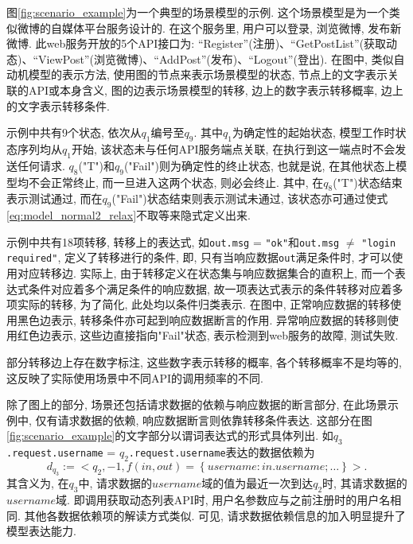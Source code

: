         图\ref{fig:scenario_example}为一个典型的场景模型的示例. 这个场景模型是为一个类似微博的自媒体平台服务设计的. 在这个服务里, 用户可以登录, 浏览微博, 发布新微博. 此web服务开放的5个API接口为: “Register”(注册)、“GetPostList”(获取动态)、“ViewPost”(浏览微博)、“AddPost”(发布)、“Logout”(登出). 在图中, 类似自动机模型的表示方法, 使用图的节点来表示场景模型的状态, 节点上的文字表示关联的API或本身含义, 图的边表示场景模型的转移, 边上的数字表示转移概率, 边上的文字表示转移条件.
        
        示例中共有9个状态, 依次从$q_1$编号至$q_9$. 其中$q_1$为确定性的起始状态, 模型工作时状态序列均从$q_1$开始, 该状态未与任何API服务端点关联, 在执行到这一端点时不会发送任何请求. $q_8$("T")和$q_9$("Fail")则为确定性的终止状态, 也就是说, 在其他状态上模型均不会正常终止, 而一旦进入这两个状态, 则必会终止. 其中, 在$q_8$("T")状态结束表示测试通过, 而在$q_9$("Fail")状态结束则表示测试未通过, 该状态亦可通过使式\ref{eq:model_normal2_relax}不取等来隐式定义出来.
        
        示例中共有18项转移, 转移上的表达式, 如\texttt{out.msg} = \texttt{"ok"}和\texttt{out.msg} $\neq$ \texttt{"login required"}, 定义了转移进行的条件, 即, 只有当响应数据\texttt{out}满足条件时, 才可以使用对应转移边. 实际上, 由于转移定义在状态集与响应数据集合的直积上, 而一个表达式条件对应着多个满足条件的响应数据, 故一项表达式表示的条件转移对应着多项实际的转移, 为了简化, 此处均以条件归类表示. 在图中, 正常响应数据的转移使用黑色边表示, 转移条件亦可起到响应数据断言的作用. 异常响应数据的转移则使用红色边表示, 这些边直接指向"Fail"状态, 表示检测到web服务的故障, 测试失败.
        
        部分转移边上存在数字标注, 这些数字表示转移的概率, 各个转移概率不是均等的, 这反映了实际使用场景中不同API的调用频率的不同.
        
        除了图上的部分, 场景还包括请求数据的依赖与响应数据的断言部分, 在此场景示例中, 仅有请求数据的依赖, 响应数据断言则依靠转移条件表达. 这部分在图\ref{fig:scenario_example}的文字部分以谓词表达式的形式具体列出. 如$q_3$\texttt{.request.username} = $q_2$\texttt{.request.username}表达的数据依赖为
        \begin{equation}
            d_{q_3} := <q_2, -1, f(in, out) = \left\{username: in.username;\dots\right\}>.
        \end{equation}
        其含义为, 在$q_3$中, 请求数据的$username$域的值为最近一次到达$q_2$时, 其请求数据的$username$域. 即调用获取动态列表API时, 用户名参数应与之前注册时的用户名相同. 其他各数据依赖项的解读方式类似. 可见, 请求数据依赖信息的加入明显提升了模型表达能力.
        
